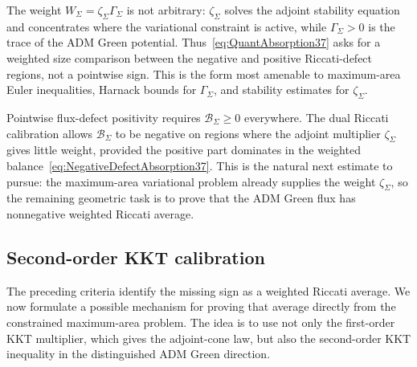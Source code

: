 \begin{remark}\label{rem:HowToUseAbsorption37}
The weight \(W_\Sigma=\zeta_\Sigma\Gamma_\Sigma\) is not arbitrary: \(\zeta_\Sigma\) solves the adjoint stability equation and concentrates where the variational constraint is active, while \(\Gamma_\Sigma>0\) is the trace of the ADM Green potential. Thus~\eqref{eq:QuantAbsorption37} asks for a weighted size comparison between the negative and positive Riccati-defect regions, not a pointwise sign. This is the form most amenable to maximum-area Euler inequalities, Harnack bounds for \(\Gamma_\Sigma\), and stability estimates for \(\zeta_\Sigma\).
\end{remark}

\begin{remark}\label{rem:DualTargetWeaker37}
Pointwise flux-defect positivity requires \(\mathcal B_\Sigma\ge0\) everywhere. The dual Riccati calibration allows \(\mathcal B_\Sigma\) to be negative on regions where the adjoint multiplier \(\zeta_\Sigma\) gives little weight, provided the positive part dominates in the weighted balance~\eqref{eq:NegativeDefectAbsorption37}. This is the natural next estimate to pursue: the maximum-area variational problem already supplies the weight \(\zeta_\Sigma\), so the remaining geometric task is to prove that the ADM Green flux has nonnegative weighted Riccati average.
\end{remark}

\subsection{Second-order KKT calibration}
\label{subsec:SecondOrderKKTCalibration}

The preceding criteria identify the missing sign as a weighted Riccati average. We now formulate a possible mechanism for proving that average directly from the constrained maximum-area problem. The idea is to use not only the first-order KKT multiplier, which gives the adjoint-cone law, but also the second-order KKT inequality in the distinguished ADM Green direction.

